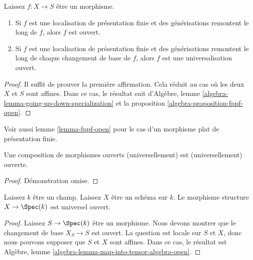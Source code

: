 \begin{lemma}

\label{lemma-locally-finite-presentation-universally-open}
Laissez $f : X \to S$ être un morphisme.
\begin{enumerate}
\item Si $f$ est une localisation de présentation finie et des générisations remontent le long de $f$, alors $f$ est ouvert.
\item Si $f$ est une localisation de présentation finie et des générisations remontent le long de chaque changement de base de $f$, alors $f$ est une universalisation ouvert.
\end{enumerate}

\end{lemma}

\begin{proof}
Il suffit de prouver la première affirmation. Cela réduit au cas où les deux $X$ et $S$ sont affines. Dans ce cas, le résultat suit d'Algèbre, lemme \ref{algebra-lemma-going-up-down-specialization} et la proposition \ref{algebra-proposition-fppf-open}.
\end{proof}

\noindent
Voir aussi lemme \ref{lemma-fppf-open} pour le cas d'un morphisme plat de présentation finie.

\begin{lemma}

\label{lemma-composition-open}

Une composition de morphismes ouverts (universellement) est (universellement) ouverte.

\end{lemma}

\begin{proof}
Démonstration omise.
\end{proof}

\begin{lemma}

\label{lemma-scheme-over-field-universally-open}
Laissez $k$ être un champ. Laissez $X$ être un schéma sur $k$. Le morphisme structure $X \to \Spec(k)$ est universel ouvert.
\end{lemma}

\begin{proof}
Laissez $S \to \Spec(k)$ être un morphisme. Nous devons montrer que le changement de base $X_S \to S$ est ouvert. La question est locale sur $S$ et $X$, donc nous pouvons supposer que $S$ et $X$ sont affines. Dans ce cas, le résultat est Algèbre, lemme \ref{algebra-lemma-map-into-tensor-algebra-open}.
\end{proof}

